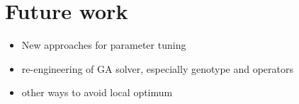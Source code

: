 \chapter{Future work}
\begin{itemize}
	\item New approaches for parameter tuning
	\item re-engineering of GA solver, especially genotype and operators  
	\item other ways to avoid local optimum
\end{itemize}